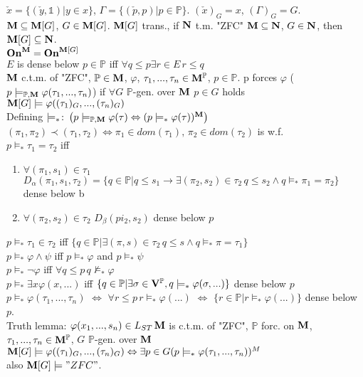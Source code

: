 \documentclass[9pt]{article}
\newcommand{\class}[1]{{\bf #1}}
\newcommand{\Pp}{\mathbb{P}}
\newcommand{\On}{\class{On}}
\newcommand{\V}{\class{V}}
\begin{document}
\begin{multicols*}{2}
$\check{x}=\{(\check{y},\mathbb{1})|y\in x\}$, $\Gamma=\{(\check{p},p)|p\in\Pp\}$. $(\check{x})_G=x$, $(\Gamma)_G=G$.\\
$\class{M}\subseteq\class{M}[G]$, $G\in\class{M}[G]$. $\class{M}[G]$ trans., if $\class{N}$ t.m. "ZFC" $
\class{M}\subseteq\class{N}$, $G\in\class{N}$, then $\class{M}[G]\subseteq \class{N}$.\\
$\On^\class{M}=\On^{\class{M}[G]}$\\
$E$ is dense below $p\in\Pp$ iff $\forall q\leqslant p\exists r\in E\,r\leqslant q$\\
$\class{M}$ c.t.m. of "ZFC", $\Pp\in\class{M}$, $\varphi$, $\tau_1,...,\tau_n\in\class{M}^\Pp$, $p\in\Pp$. p forces $\varphi$ ($p\models_{\Pp,\class{M}}\varphi(\tau_1,...,\tau_n)$) if $\forall G$ $\Pp$-gen. over $\class{M}$ $p\in G$ holds $\class{M}[G]\models\varphi((\tau_1)_G,...,(\tau_n)_G)$\\
Defining $\models_*\colon \left(p\models_{\Pp,\class{M}}\varphi(\tau)\Leftrightarrow (p\models_*\varphi(\tau))^\class{M}\right)$\\
$(\pi_1,\pi_2)\prec (\tau_1,\tau_2)\Leftrightarrow \pi_1\in dom(\tau_1),\,\pi_2\in dom(\tau_2)$ is w.f.\\
$p\models_*\tau_1=\tau_2$ iff\begin{enumerate}
	\item $\forall (\pi_1,s_1)\in\tau_1$ $D_\alpha(\pi_1,s_1,\tau_2)=\{q\in\Pp|q\leqslant s_1\to \exists(\pi_2,s_2)\in\tau_2\,q\leqslant s_2\wedge q\models_*\pi_1=\pi_2\}$ dense below b
	\item $\forall(\pi_2,s_2)\in\tau_2$ $D_\beta(pi_2,s_2)$ dense below $p$
\end{enumerate}
$p\models_*\tau_1\in\tau_2$ iff $\{q\in \Pp|\exists (\pi,s)\in\tau_2\,q\leqslant s\wedge q\models_* \pi=\tau_1\}$\\
$p\models_*\varphi\wedge\psi$ iff $p\models_*\varphi$ and $p\models_*\psi$\\
$p\models_*\neg\varphi$ iff $\forall q\leqslant p\,q\not\models_*\varphi$\\
$p\models_*\exists x\varphi(x,...)$ iff $\{q\in \Pp|\exists \sigma\in\V^\Pp,q\models_*\varphi(\sigma,...)\}$ dense below $p$\\
$p\models_*\varphi(\tau_1,...,\tau_n)$ $\Leftrightarrow$ $\forall r\leqslant p\,r\models_*\varphi(...)$ $\Leftrightarrow$ $\{r\in\Pp|r\models_*\varphi(...)\}$ dense below $p$.\\
Truth lemma: $\varphi(x_1,...,s_n)\in L_{ST}\,\class{M}$ is c.t.m. of "ZFC", $\Pp$ forc. on $\class{M}$, $\tau_1,...,\tau_n\in\class{M}^\Pp$, $G$ $\Pp$-gen. over $\class{M}$ $\class{M}[G]\models \varphi((\tau_1)_G,...,(\tau_n)_G)\Leftrightarrow\exists p\in G(p\models_*\varphi(\tau_1,...,\tau_n))^M$\\
also $\class{M}[G]\models "ZFC"$.
\end{multicols*}
\end{document}
